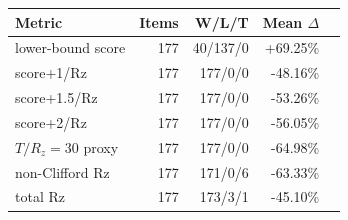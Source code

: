 \begin{tabular}{lrrrr}
\toprule
Metric & Items & W/L/T & Mean $\Delta$ \\
\midrule
lower-bound score & 177 & 40/137/0 & +69.25\% \\
score+1/Rz & 177 & 177/0/0 & -48.16\% \\
score+1.5/Rz & 177 & 177/0/0 & -53.26\% \\
score+2/Rz & 177 & 177/0/0 & -56.05\% \\
$T/R_z=30$ proxy & 177 & 177/0/0 & -64.98\% \\
non-Clifford Rz & 177 & 171/0/6 & -63.33\% \\
total Rz & 177 & 173/3/1 & -45.10\% \\
\bottomrule
\end{tabular}
